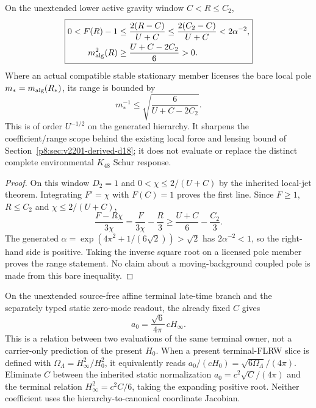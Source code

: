 \documentclass[12pt,a4paper]{article}
\begin{document}
\begin{corollary}
\label{p8:cor:v2202-lower-window-coefficient-range}
On the unextended lower active gravity window $C<R\le C_2$,
\begin{equation}
\label{p8:eq:v2202-lower-window-coefficient-range}
 \boxed{\begin{aligned}
 0<F(R)-1&\le\frac{2(R-C)}{U+C}
          \le\frac{2(C_2-C)}{U+C}<2\alpha^{-2},\\
 m_{\rm alg}^2(R)&\ge\frac{U+C-2C_2}{6}>0.
 \end{aligned}}
\end{equation}
Where an actual compatible stable stationary member licenses the bare
local pole $m_*=m_{\rm alg}(R_*)$, its range is bounded by
\[
 m_*^{-1}\le\sqrt{\frac6{U+C-2C_2}}.
\]
This is of order $U^{-1/2}$ on the generated hierarchy.  It sharpens the
coefficient/range scope behind the existing local force and lensing bound
of Section~\ref{p8:sec:v2201-derived-d18}; it does not evaluate or replace
the distinct complete environmental $K_{48}$ Schur response.
\end{corollary}
\begin{proof}
On this window $D_2=1$ and
$0<\chi\le2/(U+C)$ by the inherited local-jet theorem.
Integrating $F'=\chi$ with $F(C)=1$ proves the first line.
Since $F\ge1$, $R\le C_2$ and $\chi\le2/(U+C)$,
\[
 \frac{F-R\chi}{3\chi}
 =\frac{F}{3\chi}-\frac R3
 \ge\frac{U+C}{6}-\frac{C_2}{3}.
\]
The generated $\alpha=\exp(4\pi^2+1/(6\sqrt2))>\sqrt2$ has
$2\alpha^{-2}<1$, so the right-hand
side is positive.  Taking the inverse square root on a licensed pole
member proves the range statement.  No claim about a moving-background
coupled pole is made from this bare inequality.
\end{proof}

\begin{remark}
\label{p8:cor:v2202-terminal-floor-acceleration-relation}
On the unextended source-free affine terminal late-time branch and the separately typed
static zero-mode readout, the already fixed $C$ gives
\begin{equation}
\label{p8:eq:v2202-terminal-floor-acceleration-relation}
 \boxed{a_0=\frac{\sqrt6}{4\pi}\,cH_\infty.}
\end{equation}
This is a relation between two evaluations of the same terminal owner,
not a carrier-only prediction of the present $H_0$.  When a present
terminal-FLRW slice is defined with
$\Omega_\Lambda=H_\infty^2/H_0^2$, it equivalently reads
$a_0/(cH_0)=\sqrt{6\Omega_\Lambda}/(4\pi)$.
Eliminate $C$ between the inherited static normalization
$a_0=c^2\sqrt C/(4\pi)$ and the terminal relation
$H_\infty^2=c^2C/6$, taking the expanding positive root.
Neither coefficient uses the hierarchy-to-canonical coordinate Jacobian.
\end{remark}
\end{document}

